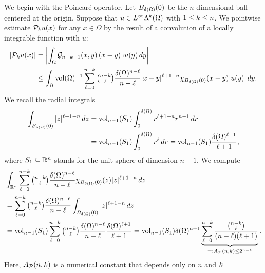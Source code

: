 \documentclass[10pt,letterpaper]{article}
\begin{document}
We begin with the Poincar\'e operator. 
Let $B_{{\delta}(\Omega)}(0)$ be the $n$-dimensional ball centered at the origin.
Suppose that $u \in L^{\infty}\Lambda^{k}(\Omega)$ with $1 \leq k \leq n$.
We pointwise estimate ${\mathcal P}_{k} u(x)$ for any $x \in \Omega$ by the result of a convolution of a locally integrable function with $u$:
\begin{align*}
    \left| {\mathcal P}_{k} u(x) \right|
    &=
    \left| 
        \int_{\Omega} {\mathcal G}_{n-k+1}(x,y) \,(x-y)\lrcorner u(y)\,dy
    \right| 
    \\&\leq 
    \int_{\Omega} \operatorname{vol}(\Omega)^{-1} \sum_{\ell=0}^{ n-k }\tbinom{ n-k }{\ell} \frac{ {\delta}(\Omega)^{n-\ell} }{n-\ell} |x-y|^{\ell+1-n} \chi_{B_{{\delta}(\Omega)}(0)}(x-y) |u(y)| \,dy
    .
\end{align*}
We recall the radial integrals 
\begin{align*}
    \int_{B_{{\delta}(\Omega)}(0)} |z|^{\ell+1-n} \,dz
    &
    =
    \operatorname{vol}_{n-1}(S_1) \int_{0}^{{\delta}(\Omega)} r^{\ell+1-n} r^{n-1} \,dr
    \\&
    =
    \operatorname{vol}_{n-1}(S_1) \int_{0}^{{\delta}(\Omega)} r^{\ell} \,dr
    =
    \operatorname{vol}_{n-1}(S_1) \frac{{\delta}(\Omega)^{\ell+1}}{\ell+1}
    ,
\end{align*}
where $S_1 \subseteq {\mathbb R}^{n}$ stands for the unit sphere of dimension $n-1$. 
We compute 
\begin{align}
    &
    \int_{{\mathbb R}^{n}} \sum_{\ell=0}^{n-k} \tbinom{n-k}{\ell} \frac{ {\delta}(\Omega)^{n-\ell} }{n-\ell} \chi_{B_{{\delta}(\Omega)}(0)}(z) |z|^{\ell+1-n} \,dz
    \\&
    =
    \sum_{\ell=0}^{n-k} \tbinom{n-k}{\ell} \frac{ {\delta}(\Omega)^{n-\ell} }{n-\ell} \int_{B_{{\delta}(\Omega)}(0)} |z|^{\ell+1-n} \,dz
    \\&
    =
    \operatorname{vol}_{n-1}(S_1) \sum_{\ell=0}^{n-k} \tbinom{n-k}{\ell} \frac{ {\delta}(\Omega)^{n-\ell} }{n-\ell} \frac{{\delta}(\Omega)^{\ell+1}}{\ell+1}
    =
    \operatorname{vol}_{n-1}(S_1) {\delta}(\Omega)^{n+1} \underbrace{ \sum_{\ell=0}^{n-k} \frac{ \tbinom{n-k}{\ell} }{ (n-\ell)(\ell+1) } }_{ =: A_{{\mathcal P}}(n,k) \leq 2^{n-k}}
    \label{equation:A_Poinc}
    .
\end{align}
Here, $A_{{\mathcal P}}(n,k)$ is a numerical constant that depends only on $n$ and $k$ 
\end{document}

